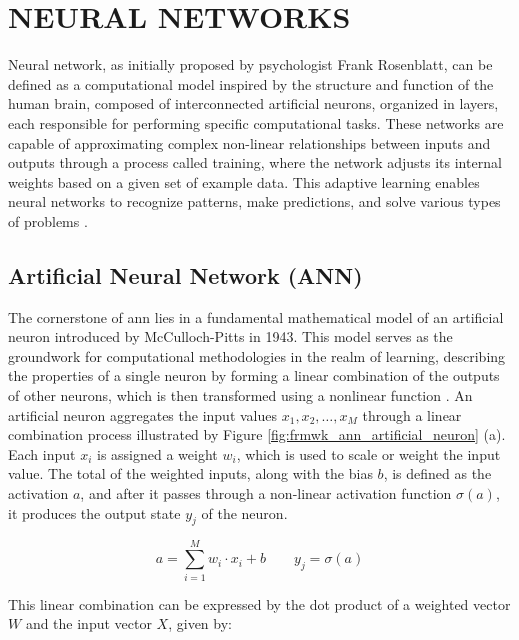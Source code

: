 \section{NEURAL NETWORKS}
\label{sec:frmwk_neural_networks}

 Neural network, as initially proposed by psychologist Frank Rosenblatt, can be defined as a computational model inspired by the structure and function of the human brain, composed of interconnected artificial neurons, organized in layers, each responsible for performing specific computational tasks. These networks are capable of approximating complex non-linear relationships between inputs and outputs through a process called training, where the network adjusts its internal weights based on a given set of example data. This adaptive learning enables neural networks to recognize patterns, make predictions, and solve various types of problems \cite{Rosenblatt1958}.
 

\subsection{Artificial Neural Network (ANN)}
\label{subsec:neural_network_ANN}

The cornerstone of \gls{ann} lies in a fundamental mathematical model of an artificial neuron introduced by McCulloch-Pitts in 1943. This model serves as the groundwork for computational methodologies in the realm of learning, describing the properties of a single neuron by forming a linear combination of the outputs of other neurons, which is then transformed using a nonlinear function \cite{Bishop2023}. An artificial neuron aggregates the input values {$x_1, x_2, \ldots , x_M$} through a linear combination process illustrated by Figure \ref{fig:frmwk_ann_artificial_neuron} (a). Each input $x_i$ is assigned a weight $w_i$, which is used to scale or weight the input value. The total of the weighted inputs, along with the bias $b$, is defined as the activation $a$, and after it passes through a non-linear activation function $\sigma(a)$, it produces the output state $y_j$ of the neuron. 

\begin{equation}
    \label{eq:ann_activation}
    a = \sum_{i=1}^M w_i \cdot x_i + b \quad\quad y_j = \sigma(a)
\end{equation}

This linear combination can be expressed by the dot product of a weighted vector $W$ and the input vector $X$, given by:

